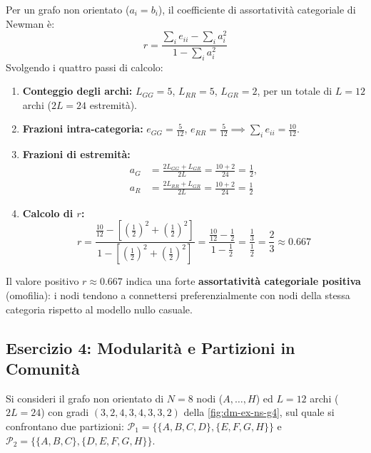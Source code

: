 Per un grafo non orientato ($a_i = b_i$), il coefficiente di assortativit\`a categoriale di Newman \`e:
\begin{equation}
    r = \frac{\sum_i e_{ii} - \sum_i a_i^2}{1 - \sum_i a_i^2}
\end{equation}
Svolgendo i quattro passi di calcolo:
\begin{enumerate}
    \item \textbf{Conteggio degli archi:} $L_{GG} = 5$, $L_{RR} = 5$, $L_{GR} = 2$, per un totale di $L = 12$ archi ($2L = 24$ estremit\`a).
    \item \textbf{Frazioni intra-categoria:} $e_{GG} = \frac{5}{12}$, $e_{RR} = \frac{5}{12} \implies \sum_i e_{ii} = \frac{10}{12}$.
    \item \textbf{Frazioni di estremit\`a:}
    \begin{align*}
        a_G &= \frac{2 L_{GG} + L_{GR}}{2L} = \frac{10 + 2}{24} = \frac{1}{2}, \\
        a_R &= \frac{2 L_{RR} + L_{GR}}{2L} = \frac{10 + 2}{24} = \frac{1}{2}
    \end{align*}
    \item \textbf{Calcolo di $r$:}
    \begin{equation*}
        r = \frac{\frac{10}{12} - \left[\left(\frac{1}{2}\right)^2 + \left(\frac{1}{2}\right)^2\right]}{1 - \left[\left(\frac{1}{2}\right)^2 + \left(\frac{1}{2}\right)^2\right]} = \frac{\frac{10}{12} - \frac{1}{2}}{1 - \frac{1}{2}} = \frac{\frac{1}{3}}{\frac{1}{2}} = \frac{2}{3} \approx 0.667
    \end{equation*}
\end{enumerate}
Il valore positivo $r \approx 0.667$ indica una forte \textbf{assortativit\`a categoriale positiva} (omofilia): i nodi tendono a connettersi preferenzialmente con nodi della stessa categoria rispetto al modello nullo casuale.

\FloatBarrier
\subsection{Esercizio 4: Modularit\`a e Partizioni in Comunit\`a}
\label{sec:dm-ex-ns-modularity}

Si consideri il grafo non orientato di $N = 8$ nodi ($A, \dots, H$) ed $L = 12$ archi ($2L = 24$) con gradi $(3, 2, 4, 3, 4, 3, 3, 2)$ della \autoref{fig:dm-ex-ns-g4}, sul quale si confrontano due partizioni: $\mathcal{P}_1 = \{\{A,B,C,D\}, \{E,F,G,H\}\}$ e $\mathcal{P}_2 = \{\{A,B,C\}, \{D,E,F,G,H\}\}$.

